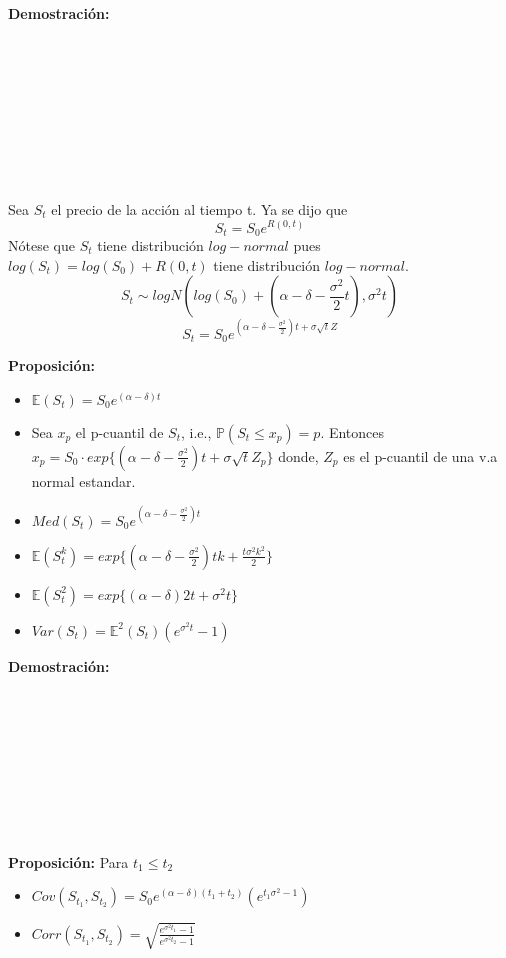 \documentclass[12pts]{extarticle}
\begin{document}
\textbf{Demostración:}
\\ \\ \\ \\ \\ \\ \\ \\ \\ \\
Sea $S_t$ el precio de la acción al tiempo t. Ya se dijo que $$S_t=S_0 e^{R(0,t)}$$ 
Nótese que $S_t$ tiene distribución $log-normal$ pues $log(S_t)=log(S_0)+R(0,t)$ tiene distribución $log-normal$. 
$$S_t \sim logN(log(S_0)+(\alpha-\delta -\frac{\sigma^2}{2} t), \sigma^2 t)$$ 
$$S_t =S_0 e^{ (\alpha -\delta -\frac{\sigma^2}{2})t +\sigma \sqrt{t}Z}$$

\textbf{Proposición:}
\begin{itemize}
\item $\mathbb{E}(S_t)=S_0 e^{(\alpha-\delta)t}$
\item Sea $x_p$ el p-cuantil de $S_t$, i.e., $\mathbb{P}(S_t \leq x_p)=p$. Entonces $x_p = S_0 \cdot exp\{(\alpha-\delta -\frac{\sigma^2}{2})t +\sigma\sqrt{t}Z_p\}$ donde, $Z_p$ es el p-cuantil de una v.a normal estandar. 
\item $Med(S_t)=S_0 e^{(\alpha-\delta-\frac{\sigma^2}{2})t}$
\item $\mathbb{E}(S_t^k)=exp\{(\alpha-\delta-\frac{\sigma^2}{2})tk + \frac{t\sigma^2  k^2}{2}\}$
\item $\mathbb{E}(S_t^2)=exp\{(\alpha-\delta)2t +\sigma^2 t\}$
\item $Var(S_t)=\mathbb{E}^2 (S_t)(e^{\sigma^2 t}-1)$
 \end{itemize}
\textbf{Demostración:}
\\ \\ \\ \\ \\ \\ \\ \\ \\ \\ 
\textbf{Proposición:} Para $t_1 \leq t_2$
\begin{itemize}
\item $Cov(S_{t_{1}}, S_{t_{2}})=S_0 e^{(\alpha-\delta)(t_1+t_2)}(e^{t_1  \sigma^2 -1})$
\item $Corr(S_{t_{1}}, S_{t_{2}})=\sqrt{\frac{e^{\sigma^2 t_1}-1}{e^{\sigma^2 t_2}-1}}$
\end{itemize} 
\end{document}
